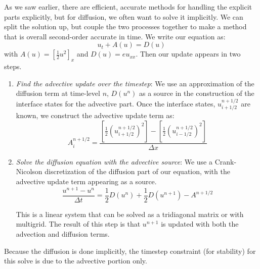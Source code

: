 As we saw earlier, there are efficient, accurate methods for handling
the explicit parts explicitly, but for diffusion, we often want to 
solve it implicitly.  We can split the solution up, but couple the 
two processes together to make a method that is overall second-order
accurate in time.  We write our equation as:
\begin{equation}
u_t + A(u) = D(u)
\end{equation}
with $A(u) = [\frac{1}{2} u^2]_x$ and $D(u) = eu_{xx}$.  Then our update 
appears in two steps.
\begin{enumerate}
\item {\em Find the advective update over the timestep}:
   We use an approximation of the diffusion term at time-level $n$, $D(u^n)$
   as a source in the construction of the interface states for the 
   advective part.  Once the interface states, $u_{i+1/2}^{n+1/2}$ are
   known, we construct the advective update term as:
   \begin{equation}
   A_i^{n+1/2} = 
     \frac{\left [ \frac{1}{2} \left (u_{i+1/2}^{n+1/2}\right)^2\right ] -
           \left [ \frac{1}{2} \left (u_{i-1/2}^{n+1/2}\right)^2\right ]}
          {\Delta x}
    \end{equation}

\item {\em Solve the diffusion equation with the advective source}:
    We use a Crank-Nicolson discretization of the diffusion part of 
    our equation, with the advective update term appearing as a source.
    \begin{equation}
    \frac{u^{n+1} - u^n}{\Delta t} = 
        \frac{1}{2}D(u^n) + \frac{1}{2}D(u^{n+1}) - A^{n+1/2}
    \end{equation}
    
    This is a linear system that can be solved as a tridiagonal matrix
    or with multigrid.  The result of this step is that $u^{n+1}$ is
    updated with both the advection and diffusion terms.

\end{enumerate}

Because the diffusion is done implicitly, the timestep constraint (for
stability) for this solve is due to the advective portion only.

